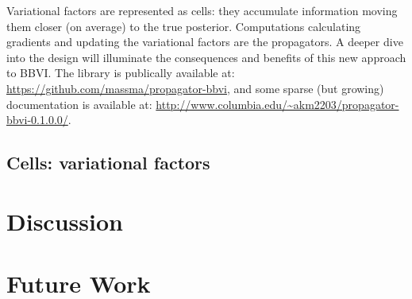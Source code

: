 \documentclass[12pt]{article}
\begin{document}
Variational factors are represented as cells: they accumulate
information moving them closer (on average) to the true
posterior. Computations calculating gradients and updating the
variational factors are the propagators. A deeper dive into the design
will illuminate the consequences and benefits of this new approach to
BBVI. The library is publically available at:
\url{https://github.com/massma/propagator-bbvi}, and some sparse (but
growing) documentation is available at:
\url{http://www.columbia.edu/~akm2203/propagator-bbvi-0.1.0.0/}.

\subsection{Cells: variational factors}


\section{Discussion}

\section{Future Work}


\end{document}

